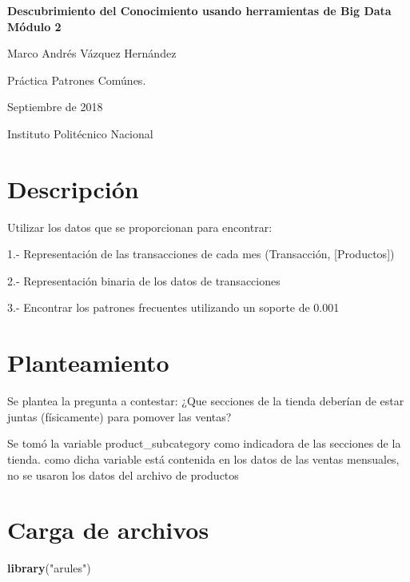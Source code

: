 \documentclass[]{article}
\title{}
\author{}
\date{}
\newenvironment{Shaded}{\begin{snugshade}}{\end{snugshade}}
\newcommand{\KeywordTok}[1]{\textcolor[rgb]{0.13,0.29,0.53}{\textbf{#1}}}
\newcommand{\StringTok}[1]{\textcolor[rgb]{0.31,0.60,0.02}{#1}}
\newcommand{\NormalTok}[1]{#1}
\begin{document}
\begin{centering}

\vspace*{5 cm}

\Huge

{\bf Descubrimiento del Conocimiento usando herramientas de Big Data Módulo 2}

\vspace{3 cm}

\Large
Marco Andrés Vázquez Hernández

\vspace{1 cm}
\normalsize
Práctica Patrones Comúnes. 

Septiembre de 2018

\normalsize
Instituto Politécnico Nacional


\end{centering}

\newpage

\section{Descripción}\label{descripcion}

Utilizar los datos que se proporcionan para encontrar:

1.- Representación de las transacciones de cada mes (Transacción,
{[}Productos{]})

2.- Representación binaria de los datos de transacciones

3.- Encontrar los patrones frecuentes utilizando un soporte de 0.001

\section{Planteamiento}\label{planteamiento}

Se plantea la pregunta a contestar: ¿Que secciones de la tienda deberían
de estar juntas (físicamente) para pomover las ventas?

Se tomó la variable product\_subcategory como indicadora de las
secciones de la tienda. como dicha variable está contenida en los datos
de las ventas mensuales, no se usaron los datos del archivo de productos

\section{Carga de archivos}\label{carga-de-archivos}

\begin{Shaded}
\begin{Highlighting}[]
\KeywordTok{library}\NormalTok{(}\StringTok{"arules"}\NormalTok{)}
\end{Highlighting}
\end{Shaded}
\end{document}
